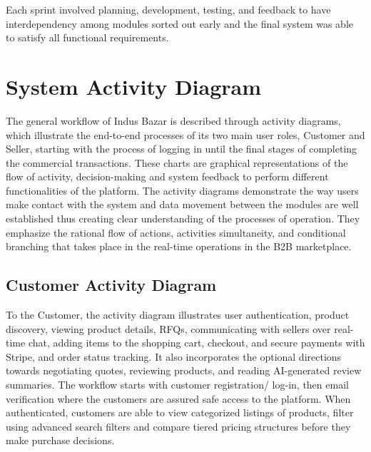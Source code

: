 Each sprint involved planning, development, testing, and feedback to have interdependency among modules sorted out early and the final system was able to satisfy all functional requirements.

\section{System Activity Diagram}

The general workflow of Indus Bazar is described through activity diagrams, which illustrate the end-to-end processes of its two main user roles, Customer and Seller, starting with the process of logging in until the final stages of completing the commercial transactions. These charts are graphical representations of the flow of activity, decision-making and system feedback to perform different functionalities of the platform. The activity diagrams demonstrate the way users make contact with the system and data movement between the modules are well established thus creating clear understanding of the processes of operation. They emphasize the rational flow of actions, activities simultaneity, and conditional branching that takes place in the real-time operations in the B2B marketplace.

\subsection{Customer Activity Diagram}

To the Customer, the activity diagram illustrates user authentication, product discovery, viewing product details, RFQs, communicating with sellers over real-time chat, adding items to the shopping cart, checkout, and secure payments with Stripe, and order status tracking. It also incorporates the optional directions towards negotiating quotes, reviewing products, and reading AI-generated review summaries. The workflow starts with customer registration/ log-in, then email verification where the customers are assured safe access to the platform. When authenticated, customers are able to view categorized listings of products, filter using advanced search filters and compare tiered pricing structures before they make purchase decisions. 

